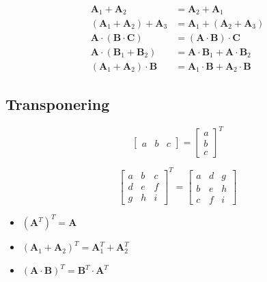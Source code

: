 \begin{align*}
    \mathbf{A}_1 + \mathbf{A}_2 &= \mathbf{A}_2 + \mathbf{A}_1 \\
    (\mathbf{A}_1 + \mathbf{A}_2) + \mathbf{A}_3 &= \mathbf{A}_1 + (\mathbf{A}_2 + \mathbf{A}_3) \\
    \mathbf{A} \cdot (\mathbf{B} \cdot \mathbf{C}) &= (\mathbf{A} \cdot \mathbf{B}) \cdot \mathbf{C} \\
    \mathbf{A} \cdot (\mathbf{B}_1 + \mathbf{B}_2) &= \mathbf{A} \cdot \mathbf{B}_1 + \mathbf{A} \cdot \mathbf{B}_2 \\
    (\mathbf{A}_1 + \mathbf{A}_2) \cdot \mathbf{B} &= \mathbf{A}_1 \cdot \mathbf{B} + \mathbf{A}_2 \cdot \mathbf{B} 
\end{align*}

\subsection{Transponering}
\begin{minipage}{0.35\textwidth}
    \[
        \begin{bmatrix}
            a & b & c
        \end{bmatrix}
        =
        \begin{bmatrix}
            a \\
            b \\
            c
        \end{bmatrix}^{T}
    \]
\end{minipage}
\hfill
\begin{minipage}{0.55\textwidth}
\[
    \begin{bmatrix}
        a & b & c \\
        d & e & f \\
        g & h & i
    \end{bmatrix}^{\!T}
    =
    \begin{bmatrix}
        a & d & g \\
        b & e & h \\
        c & f & i
    \end{bmatrix}
\]
\end{minipage}


\begin{itemize}
    \item $(\mathbf{A}^T)^T=\mathbf{A}$
    \item $(\mathbf{A}_1+\mathbf{A}_2)^T=\mathbf{A}_1^T+\mathbf{A}_2^T$
    \item $(\mathbf{A} \cdot \mathbf{B})^T = \mathbf{B}^T \cdot \mathbf{A}^T $ \hfill {}
\end{itemize}

